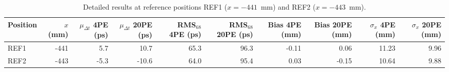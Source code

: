 \begin{table}[htbp]
\centering
\small
\caption{Detailed results at reference positions REF1 ($x=-441$~mm) and REF2 ($x=-443$~mm).}
\label{tab:reference_positions}
\begin{tabular}{lrrrrrrrrr}
\toprule
\textbf{Position} & \textbf{$x$ (mm)} & \textbf{$\mu_{\Delta t}$ 4PE (ps)} & \textbf{$\mu_{\Delta t}$ 20PE (ps)} & \textbf{RMS$_{68}$ 4PE (ps)} & \textbf{RMS$_{68}$ 20PE (ps)} & \textbf{Bias 4PE (mm)} & \textbf{Bias 20PE (mm)} & \textbf{$\sigma_x$ 4PE (mm)} & \textbf{$\sigma_x$ 20PE (mm)} \\
\midrule
REF1 & -441 & 5.7 & 10.7 & 65.3 & 96.3 & -0.11 & 0.06 & 11.23 & 9.96 \\
REF2 & -443 & -5.3 & -10.6 & 64.0 & 95.4 & 0.03 & -0.15 & 10.64 & 9.88 \\
\bottomrule
\end{tabular}
\end{table}
